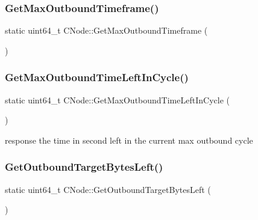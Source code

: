 \subsubsection{\texorpdfstring{Get\+Max\+Outbound\+Timeframe()}{GetMaxOutboundTimeframe()}}
{\footnotesize\ttfamily static uint64\+\_\+t C\+Node\+::\+Get\+Max\+Outbound\+Timeframe (\begin{DoxyParamCaption}{ }\end{DoxyParamCaption})\hspace{0.3cm}{\ttfamily [static]}}

\mbox{\label{class_c_node_a2354702a34b4f8d269732c37ae89b03f}} 
\subsubsection{\texorpdfstring{Get\+Max\+Outbound\+Time\+Left\+In\+Cycle()}{GetMaxOutboundTimeLeftInCycle()}}
{\footnotesize\ttfamily static uint64\+\_\+t C\+Node\+::\+Get\+Max\+Outbound\+Time\+Left\+In\+Cycle (\begin{DoxyParamCaption}{ }\end{DoxyParamCaption})\hspace{0.3cm}{\ttfamily [static]}}



response the time in second left in the current max outbound cycle 

\mbox{\label{class_c_node_a4f248ec86baffc7c4d97946b4887b193}} 
\subsubsection{\texorpdfstring{Get\+Outbound\+Target\+Bytes\+Left()}{GetOutboundTargetBytesLeft()}}
{\footnotesize\ttfamily static uint64\+\_\+t C\+Node\+::\+Get\+Outbound\+Target\+Bytes\+Left (\begin{DoxyParamCaption}{ }\end{DoxyParamCaption})\hspace{0.3cm}{\ttfamily [static]}}



